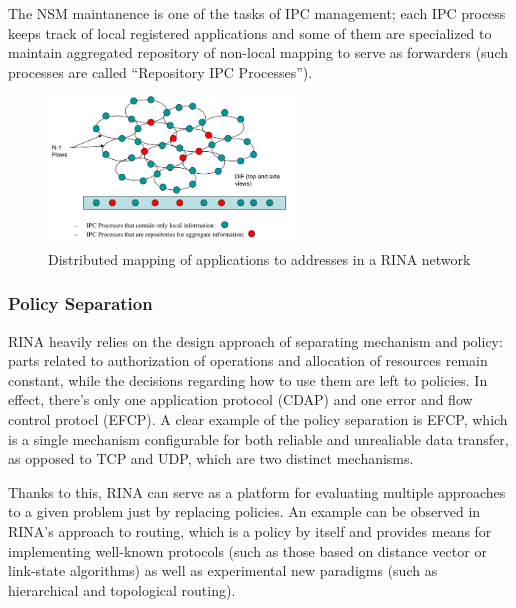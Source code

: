                 The NSM maintanence is one of the tasks of IPC management; each IPC process keeps track of local registered applications and some of them are specialized to maintain aggregated repository of non-local mapping to serve as forwarders (such processes are called ``Repository IPC Processes'').

                \begin{figure}[H]
                    \begin{center}
                        \includegraphics[width=0.6\textwidth]{fig/archs_rina-nsm.png}
                      \caption{Distributed mapping of applications to addresses in a RINA network}
                      \label{fig:rina_nsm}
                    \end{center}
                \end{figure}

            \subsubsection{Policy Separation}

                RINA heavily relies on the design approach of separating mechanism and policy: parts related to authorization of operations and allocation of resources remain constant, while the decisions regarding how to use them are left to policies. In effect, there's only one application protocol (CDAP) and one error and flow control protocl (EFCP). A clear example of the policy separation is EFCP, which is a single mechanism configurable for both reliable and unrealiable data transfer, as opposed to TCP and UDP, which are two distinct mechanisms.

                Thanks to this, RINA can serve as a platform for evaluating multiple approaches to a given problem just by replacing policies. An example can be observed in RINA's approach to routing, which is a policy by itself and provides means for implementing well-known protocols (such as those based on distance vector or link-state algorithms) as well as experimental new paradigms (such as hierarchical and topological routing).

